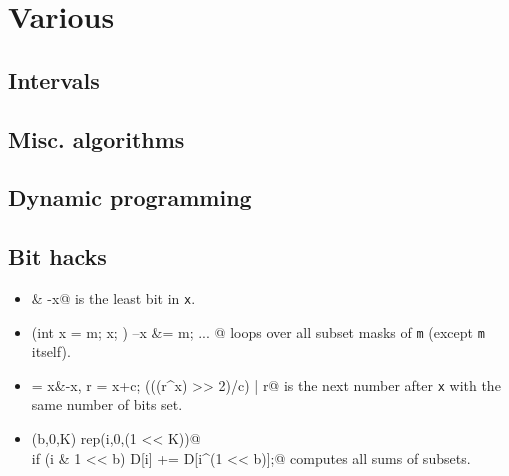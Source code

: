 \chapter{Various}

\section{Intervals}

\section{Misc. algorithms}

\section{Dynamic programming}


\section{Bit hacks}
	\begin{itemize}
		\item \verb@x & -x@ is the least bit in \texttt{x}.
		\item \verb@for (int x = m; x; ) { --x &= m; ... }@ loops over all subset masks of \texttt{m} (except \texttt{m} itself).
		\item \verb@c = x&-x, r = x+c; (((r^x) >> 2)/c) | r@ is the next number after \texttt{x} with the same number of bits set.
		\item \verb@rep(b,0,K) rep(i,0,(1 << K))@ \\ \verb@  if (i & 1 << b) D[i] += D[i^(1 << b)];@ computes all sums of subsets.
	\end{itemize}

